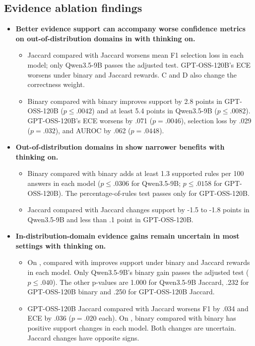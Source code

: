 \subsection*{Evidence ablation findings}
\begin{itemize}
\item \textbf{Better evidence support can accompany worse confidence metrics on out-of-distribution domains in \SP{} with thinking on.}
\begin{itemize}
\item Jaccard \armD{} compared with Jaccard \armB{} worsens mean F1 selection loss in each model; only Qwen3.5-9B passes the adjusted test. GPT-OSS-120B's ECE worsens under binary and Jaccard rewards. C and D also change the correctness weight.
\item Binary \armC{} compared with binary \armB{} improves support by 2.8 points in GPT-OSS-120B ($p\leq.0042$) and at least 5.4 points in Qwen3.5-9B ($p\leq.0082$). GPT-OSS-120B's ECE worsens by .071 ($p=.0046$), selection loss by .029 ($p=.032$), and AUROC by .062 ($p=.0448$).
\end{itemize}
\item \textbf{Out-of-distribution domains in \DB{} show narrower benefits with thinking on.}
\begin{itemize}
\item Binary \armD{} compared with binary \armB{} adds at least 1.3 supported rules per 100 answers in each model ($p\leq.0306$ for Qwen3.5-9B; $p\leq.0158$ for GPT-OSS-120B). The percentage-of-rules test passes only for GPT-OSS-120B.
\item Jaccard \armD{} compared with Jaccard \armB{} changes support by -1.5 to -1.8 points in Qwen3.5-9B and less than .1 point in GPT-OSS-120B.
\end{itemize}
\item \textbf{In-distribution-domain evidence gains remain uncertain in most settings with thinking on.}
\begin{itemize}
\item On \SP{}, \armD{} compared with \armB{} improves support under binary and Jaccard rewards in each model. Only Qwen3.5-9B's binary gain passes the adjusted test ($p\leq.040$). The other p-values are 1.000 for Qwen3.5-9B Jaccard, .232 for GPT-OSS-120B binary and .250 for GPT-OSS-120B Jaccard.
\item GPT-OSS-120B Jaccard \armD{} compared with Jaccard \armB{} worsens F1 by .034 and ECE by .036 ($p=.020$ each). On \DB{}, binary \armD{} compared with binary \armB{} has positive support changes in each model. Both changes are uncertain. Jaccard changes have opposite signs.
\end{itemize}
\end{itemize}
\endgroup
